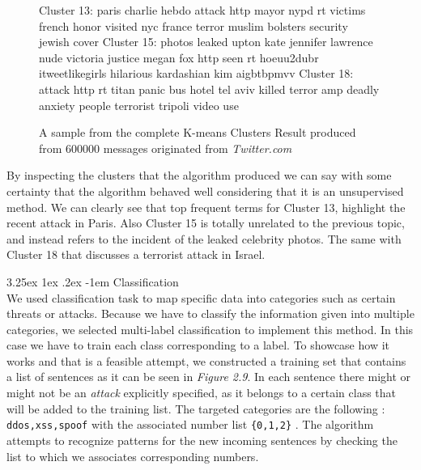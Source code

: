\documentclass[12pt]{article}
\makeatletter
\renewcommand\paragraph{\@startsection{paragraph}{5}{\z@}%
  {3.25ex \@plus1ex \@minus.2ex}%
  {-1em}%
  {\normalfont\normalsize\bfseries}}
\makeatother
\begin{document}
\begin{figure}[h!]
\begin{footnotesize}
\begin{spverbatim}
Cluster 13:  paris  charlie  hebdo  attack  http  mayor  nypd  
rt  victims  french  honor  visited  nyc  france  terror  muslim 
 bolsters  security  jewish  cover
Cluster 15:  photos  leaked  upton  kate  jennifer  lawrence 
 nude  victoria  justice  megan  fox  http  seen  rt  hoeuu2dubr  
itweetlikegirls  hilarious  kardashian  kim  aigbtbpmvv
Cluster 18: attack http rt titan panic bus hotel tel aviv killed 
terror amp deadly anxiety people terrorist tripoli video use
\end{spverbatim}
\end{footnotesize}
\captionsetup{font=small}
\caption{A sample from the complete K-means Clusters Result produced from  600000 messages originated from \textit{Twitter.com} }
\label{fig:clusters}
\end{figure}
\hfill \break
By inspecting the clusters that the algorithm produced we can say with some certainty that the algorithm behaved well considering that it is an unsupervised method.
We can clearly see that top frequent terms for Cluster 13, highlight the recent attack in Paris\cite{hebdo}. Also Cluster 15 is totally unrelated to the previous topic, and instead refers to the incident of the leaked celebrity photos\cite{fappening}. The same with Cluster 18 that discusses a terrorist attack in Israel\cite{tel-aviv}.  

\paragraph{Classification}
\hfill \break
\\
We used classification task to map specific data into categories such as certain threats or attacks. Because we have to classify the information given into multiple categories, we selected multi-label classification\cite{classiciation-multilabel} to implement this method. In this case we have to train each class corresponding to a label. To showcase how it works and that is a feasible attempt, we constructed a training set that contains a list of sentences as it can be seen in \textit{Figure 2.9}. In each sentence there might or might not be an \textit{attack} explicitly specified, as it belongs to a certain class that will be added to the training list.  The targeted categories are the following : \texttt{ddos,xss,spoof} with the associated number list \texttt{\{0,1,2\}} . The algorithm attempts to recognize patterns for the new incoming sentences by checking the list to which we associates corresponding numbers.    
\end{document}
